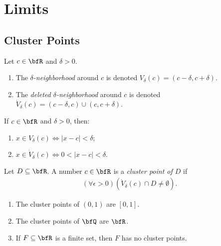 \chapter{Limits}

\section{Cluster Points}\label{section:cluster-points}
    \begin{definition}
        Let $c \in \bfR$ and $\delta > 0$.
            \begin{enumerate}[label = (\arabic*)]
                \item The \textit{$\delta$-neighborhood} around $c$ is denoted $V_\delta(c) = (c - \delta, c+\delta)$.
                \item The \textit{deleted $\delta$-neighborhood} around $c$ is denoted $\dot{V}_\delta(c) = (c-\delta,c) \cup (c,c+\delta)$.
            \end{enumerate}
    \end{definition}

    \begin{lemma}
        If $c \in \bfR$ and $\delta > 0$, then:
            \begin{enumerate}[label = (\arabic*)]
                \item $x \in V_\delta(c) \iff |x-c| < \delta$;
                \item $x \in \dot{V}_\delta(c) \iff 0 < |x-c| < \delta$.
            \end{enumerate}
    \end{lemma}

    \begin{definition}
        Let $D\subseteq \bfR$. A number $c \in \bfR$ is a \textit{cluster point of $D$} if
            \begin{equation*}
            \begin{split}
                (\forall \epsilon > 0)(\dot{V}_\delta(c) \cap D \neq \emptyset).
            \end{split}
            \end{equation*}
    \end{definition}

    \begin{example}
        \phantom{a}
        \begin{enumerate}[label = (\arabic*)]
            \item The cluster points of $(0,1)$ are $[0,1]$.
            \item The cluster points of $\bfQ$ are $\bfR$.
            \item If $F \subseteq \bfR$ is a finite set, then $F$ has no cluster points.
        \end{enumerate}
    \end{example}

